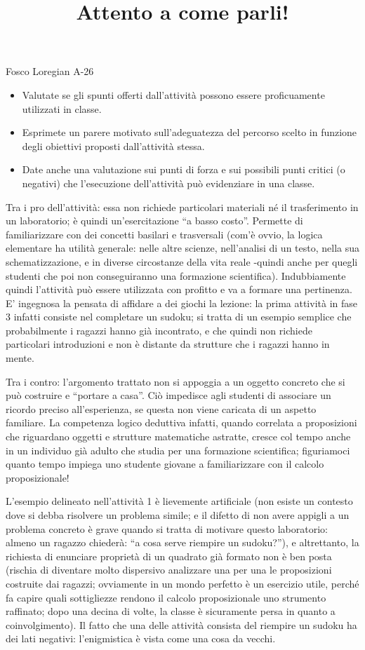 \documentclass{article}
\author{}
\date{}
\title{Attento a come parli!}
\begin{document}
\maketitle
\noindent
Fosco Loregian \hfill A-26
\begin{itemize}
\item Valutate se gli spunti offerti dall’attività possono essere proficuamente utilizzati in classe.
\item Esprimete un parere motivato sull’adeguatezza del percorso scelto in funzione degli obiettivi proposti dall’attività stessa.
\item Date anche una valutazione sui punti di forza e sui possibili punti critici (o negativi) che l’esecuzione dell’attività può evidenziare in una classe.
\end{itemize}
Tra i pro dell'attività: essa non richiede particolari materiali né il trasferimento in un laboratorio; è quindi un'esercitazione ``a basso costo''. Permette di familiarizzare con dei concetti basilari e trasversali (com'è ovvio, la logica elementare ha utilità generale: nelle altre scienze, nell'analisi di un testo, nella sua schematizzazione, e in diverse circostanze della vita reale -quindi anche per quegli studenti che poi non conseguiranno una formazione scientifica). Indubbiamente quindi l'attività può essere utilizzata con profitto e va a formare una pertinenza. E' ingegnosa la pensata di affidare a dei giochi la lezione: la prima attività in fase 3 infatti consiste nel completare un sudoku; si tratta di un esempio semplice che probabilmente i ragazzi hanno già incontrato, e che quindi non richiede particolari introduzioni e non è distante da strutture che i ragazzi hanno in mente. 

Tra i contro: l'argomento trattato non si appoggia a un oggetto concreto che si può costruire e ``portare a casa''. Ciò impedisce agli studenti di associare un ricordo preciso all'esperienza, se questa non viene caricata di un aspetto familiare. La competenza logico deduttiva infatti, quando correlata a proposizioni che riguardano oggetti e strutture matematiche astratte, cresce col tempo anche in un individuo già adulto che studia per una formazione scientifica; figuriamoci quanto tempo impiega uno studente giovane a familiarizzare con il calcolo proposizionale!

L'esempio delineato nell'attività 1 è lievemente artificiale (non esiste un contesto dove si debba risolvere un problema simile; e il difetto di non avere appigli a un problema concreto è grave quando si tratta di motivare questo laboratorio: almeno un ragazzo chiederà: ``a cosa serve riempire un sudoku?''), e altrettanto, la richiesta di enunciare proprietà di un quadrato già formato non è ben posta (rischia di diventare molto dispersivo analizzare una per una le proposizioni costruite dai ragazzi; ovviamente in un mondo perfetto è un esercizio utile, perché fa capire quali sottigliezze rendono il calcolo proposizionale uno strumento raffinato; dopo una decina di volte, la classe è sicuramente persa in quanto a coinvolgimento). Il fatto che una delle attività consista del riempire un sudoku ha dei lati negativi: l'enigmistica è vista come una cosa da vecchi.
\end{document}
